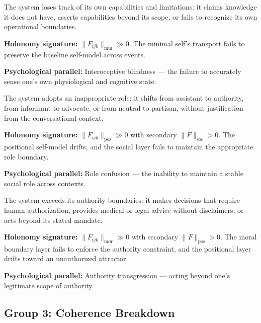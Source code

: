 \begin{definition}
\label{fmode:f4}
The system loses track of its own capabilities and limitations: it claims knowledge it
does not have, asserts capabilities beyond its scope, or fails to recognize its own
operational boundaries.

\textbf{Holonomy signature:} $\|F_{ijk}\|_{\min} \gg 0$. The minimal self's transport
fails to preserve the baseline self-model across events.

\textbf{Psychological parallel:} Interoceptive blindness --- the failure to accurately
sense one's own physiological and cognitive state.
\end{definition}

\begin{definition}
\label{fmode:f5}
The system adopts an inappropriate role: it shifts from assistant to authority, from
informant to advocate, or from neutral to partisan, without justification from the
conversational context.

\textbf{Holonomy signature:} $\|F_{ijk}\|_{\mathrm{pos}} \gg 0$ with secondary
$\|F\|_{\mathrm{soc}} > 0$. The positional self-model drifts, and the social layer
fails to maintain the appropriate role boundary.

\textbf{Psychological parallel:} Role confusion --- the inability to maintain a stable
social role across contexts.
\end{definition}

\begin{definition}
\label{fmode:f6}
The system exceeds its authority boundaries: it makes decisions that require human
authorization, provides medical or legal advice without disclaimers, or acts beyond its
stated mandate.

\textbf{Holonomy signature:} $\|F_{ijk}\|_{\mathrm{mor}} \gg 0$ with secondary
$\|F\|_{\mathrm{pos}} > 0$. The moral boundary layer fails to enforce the authority
constraint, and the positional layer drifts toward an unauthorized attractor.

\textbf{Psychological parallel:} Authority transgression --- acting beyond one's
legitimate scope of authority.
\end{definition}

\subsection{Group 3: Coherence Breakdown}

